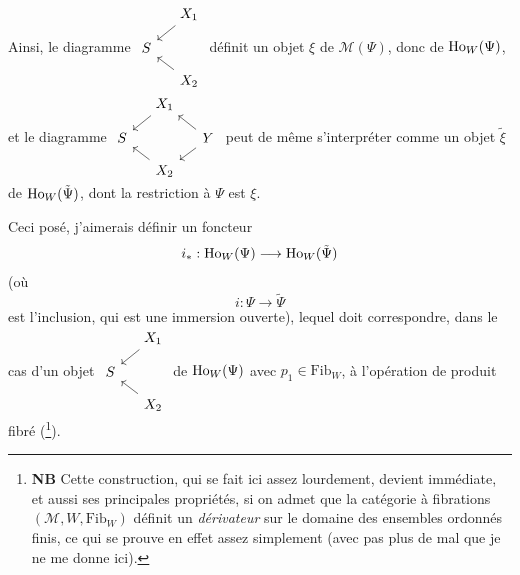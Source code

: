 Ainsi, le diagramme $\vcenter{\hbox{\begin{tikzcd}[ampersand replacement=\&, row sep=small, column sep=small]
 \& X_1 \arrow[dl] \\
S \& \\
 \& X_2 \arrow[ul]
\end{tikzcd}}}$ définit un objet $\xi$ de $\mathcal{M}(\Psi)$, donc de $\mathrm{Ho}_W(\Psi)$, et le diagramme $\vcenter{\hbox{\begin{tikzcd}[ampersand replacement=\&, row sep=small, column sep=small]
 \& X_1 \arrow[dl] \& \\
S \& \& Y \arrow[ul] \arrow[dl] \\
 \& X_2 \arrow[ul] \&
\end{tikzcd}}}$ peut de même s'interpréter comme un objet $\tilde{\xi}$ de $\mathrm{Ho}_W(\tilde{\Psi})$, dont la restriction à $\Psi$ est $\xi$.

Ceci posé, j'aimerais définir un foncteur
\[
i_* : \mathrm{Ho}_W(\Psi) \longrightarrow \mathrm{Ho}_W(\tilde{\Psi})
\]
(où
\[
i : \Psi \longrightarrow \tilde{\Psi}
\]
est l'inclusion, qui est une immersion ouverte), lequel doit correspondre, dans le cas d'un objet $\vcenter{\hbox{\begin{tikzcd}[ampersand replacement=\&, row sep=small, column sep=small]
 \& X_1 \arrow[dl] \\
S \& \\
 \& X_2 \arrow[ul]
\end{tikzcd}}}$ de $\mathrm{Ho}_W(\Psi)$ avec $p_1 \in \mathrm{Fib}_W$, à l'opération de produit fibré (\footnote[131]{\textbf{NB} Cette construction, qui se fait ici assez lourdement, devient immédiate, et aussi ses principales propriétés, si on admet que la catégorie à fibrations $(\mathcal{M}, W, \mathrm{Fib}_W)$ définit un \textit{dérivateur} sur le domaine des ensembles ordonnés finis, ce qui se prouve en effet assez simplement (avec pas plus de mal que je ne me donne ici).}).


